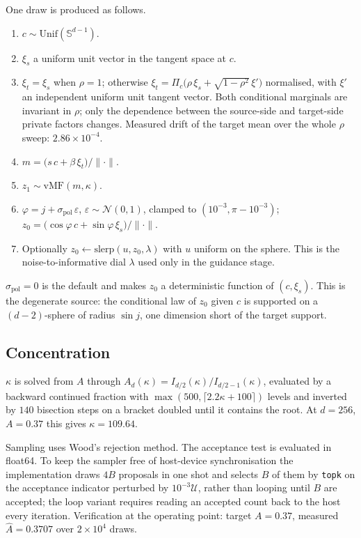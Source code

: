 \documentclass[11pt]{article}
\newcommand{\Sph}{\mathbb{S}}
\begin{document}
One draw is produced as follows.
\begin{enumerate}\itemsep1pt
\item $c\sim\mathrm{Unif}(\Sph^{d-1})$.
\item $\xi_s$ a uniform unit vector in the tangent space at $c$.
\item $\xi_t=\xi_s$ when $\rho=1$; otherwise
$\xi_t=\Pi_c\big(\rho\,\xi_s+\sqrt{1-\rho^2}\,\xi'\big)$ normalised, with $\xi'$ an independent
uniform unit tangent vector. Both conditional marginals are invariant in $\rho$; only the
dependence between the source-side and target-side private factors changes. Measured drift of the
target mean over the whole $\rho$ sweep: $2.86\times10^{-4}$.
\item $m=\big(s\,c+\beta\,\xi_t\big)/\|\cdot\|$.
\item $z_1\sim\mathrm{vMF}(m,\kappa)$.
\item $\varphi=j+\sigma_{\mathrm{pol}}\,\varepsilon$, $\varepsilon\sim\mathcal N(0,1)$, clamped to
$(10^{-3},\pi-10^{-3})$; $z_0=\big(\cos\varphi\,c+\sin\varphi\,\xi_s\big)/\|\cdot\|$.
\item Optionally $z_0\leftarrow\mathrm{slerp}(u,z_0,\lambda)$ with $u$ uniform on the sphere. This
is the noise-to-informative dial $\lambda$ used only in the guidance stage.
\end{enumerate}

$\sigma_{\mathrm{pol}}=0$ is the default and makes $z_0$ a deterministic function of $(c,\xi_s)$.
This is the degenerate source: the conditional law of $z_0$ given $c$ is supported on a
$(d-2)$-sphere of radius $\sin j$, one dimension short of the target support.

\subsection*{Concentration}

$\kappa$ is solved from $A$ through $A_d(\kappa)=I_{d/2}(\kappa)/I_{d/2-1}(\kappa)$, evaluated by
a backward continued fraction with $\max(500,\lceil 2.2\kappa+100\rceil)$ levels and inverted by
$140$ bisection steps on a bracket doubled until it contains the root. At $d=256$, $A=0.37$ this
gives $\kappa=109.64$.

Sampling uses Wood's rejection method. The acceptance test is evaluated in float64. To keep the
sampler free of host-device synchronisation the implementation draws $4B$ proposals in one shot
and selects $B$ of them by \texttt{topk} on the acceptance indicator perturbed by
$10^{-3}\mathcal U$, rather than looping until $B$ are accepted; the loop variant requires reading
an accepted count back to the host every iteration. Verification at the operating point: target
$A=0.37$, measured $\hat A=0.3707$ over $2\times10^{4}$ draws.
\end{document}
